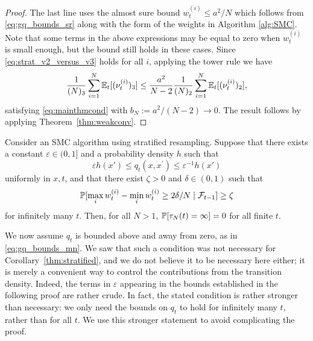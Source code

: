 \begin{proof}
The last line uses the almost sure bound $w_t^{(i)} \leq a^2 /N$ which follows from \eqref{eq:gq_bounds_sr} along with the form of the weights in Algorithm \ref{alg:SMC}.
Note that some terms in the above expressions may be equal to zero when $w_t^{(i)}$ is small enough, but the bound still holds in these cases.
Since \eqref{eq:strat_v2_versus_v3} holds for all $i$, applying the tower rule we have
\begin{equation*}
\frac{1}{(N)_3} \sum_{i=1}^{N} \mathbb{E}_t [(\nu_t^{(i)})_3 ]
\leq \frac{a^2}{N-2} \frac{1}{(N)_2} \sum_{i=1}^{N} \mathbb{E}_t [(\nu_t^{(i)})_2 ] ,
\end{equation*}
satisfying \eqref{eq:mainthmcond} with $b_N := a^2/(N-2) \rightarrow 0$.
The result follows by applying Theorem~\ref{thm:weakconv}.
\end{proof}



\begin{prop}\label{thm:strat_nontriviality}
Consider an SMC algorithm using stratified resampling.
Suppose that there exists a constant $\varepsilon \in (0,1]$ and a probability density $h$ such that
\begin{equation*}
\varepsilon h(x') \leq q_t(x, x^\prime) \leq \varepsilon^{-1} h(x')
\end{equation*}
uniformly in $x,t$, and that there exist $\zeta >0$ and $\delta \in (0,1)$ such that 
\begin{equation}
\mathbb{P}[ \max_i w_t^{(i)} - \min_i w_t^{(i)} \geq 2\delta/N \mid \mathcal{F}_{t-1} ] \geq \zeta \label{eq:strat_minmaxweight}
\end{equation}
 for infinitely many $t$. Then, for all $N>1$, $\mathbb{P}[ \tau_N(t) = \infty ] =0$ for all finite $t$.
\end{prop}
We now assume $q_t$ is bounded above and away from zero, as in \eqref{eq:gq_bounds_mn}.
We saw that such a condition was not necessary for Corollary~\ref{thm:stratified}, and we do not believe it to be necessary here either; it is merely a convenient way to control the contributions from the transition density. Indeed, the terms in $\varepsilon$ appearing in the bounds established in the following proof are rather crude.
In fact, the stated condition is rather stronger than necessary: we only need the bounds on $q_t$ to hold for infinitely many $t$, rather than for all $t$. We use this stronger statement to avoid complicating the proof.

